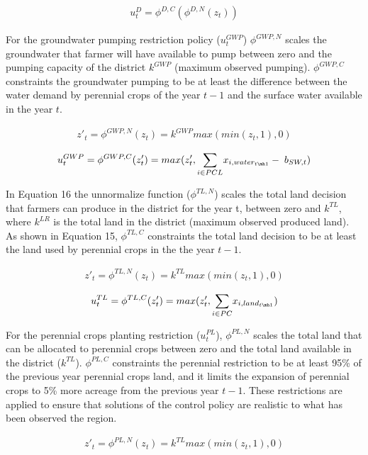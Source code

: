 \documentclass[11pt,a4paper]{article}
\begin{document}
\begin{align}
u^{D}_t = \phi^{D,C}(\phi^{D,N}(z_{t}))
\end{align}

For the groundwater pumping restriction policy ($u^{GWP}_t$) $\phi^{GWP,N}$ scales the groundwater that farmer will have available to pump between zero and the pumping capacity of the district $k^{GWP}$ (maximum observed pumping). $\phi^{GWP,C}$ constraints the groundwater pumping to be at least the difference between the water demand by perennial crops of the year $t-1$ and the surface water available in the year $t$. 

\begin{align}
z'_{t}=\phi^{GWP,N}(z_{t}) = k^{GWP}max(min(z_{t},1),0) 
\end{align}

\begin{align}
u^{GWP}_t = \phi^{GWP,C}(z'_{t})= max(z'_{t},\underset{i \in PCL}{\sum} x_{i,water_{t\mh1}} - \; b_{SW,t})
\end{align}

In Equation 16 the unnormalize function ($\phi^{TL,N}$) scales the total land decision that farmers can produce in the district for the year t, between zero and $k^{TL}$, where $k^{LR}$ is the total land in the district (maximum observed produced land). As shown in Equation 15, $\phi^{TL,C}$ constraints the total land decision to be at least the land used by perennial crops in the the year $t-1$.

\begin{align}
z'_{t} = \phi^{TL,N}(z_{t}) = k^{TL}max(min(z_{t},1),0)
\end{align}

\begin{align}
u^{TL}_t = \phi^{TL,C}(z'_{t})= max(z'_{t},\underset{i \in PC}{\sum} x_{i,land_{t\mh1}})
\end{align}


For the perennial crops planting restriction ($u^{PL}_t$), $\phi^{PL,N}$ scales the total land that can be allocated to perennial crops between zero and the total land available in the district ($k^{TL}$). $\phi^{PL,C}$ constraints the perennial restriction to be at least 95\% of the previous year perennial crops land, and it limits the expansion of perennial crops to 5\% more acreage from the previous year $t-1$. These restrictions are applied to ensure that solutions of the control policy are realistic to what has been observed the region.

\begin{align}
z'_{t} = \phi^{PL,N}(z_{t}) = k^{TL}max(min(z_{t},1),0)
\end{align}
\end{document}
